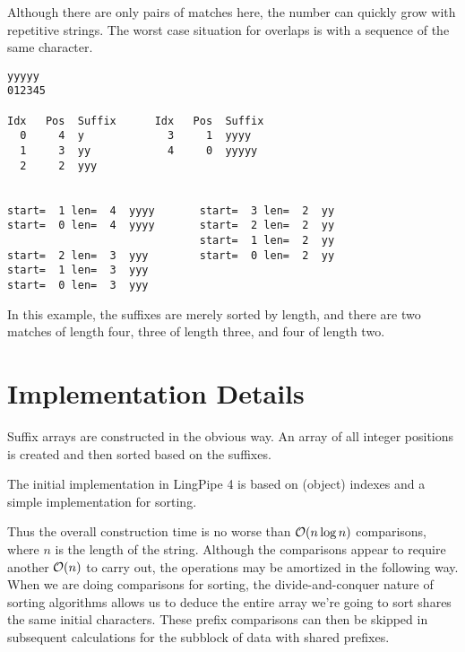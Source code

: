 Although there are only pairs of matches here, the number can
quickly grow with repetitive strings.  The worst case situation for
overlaps is with a sequence of the same character. 
%
\begin{verbatim}
yyyyy
012345

Idx   Pos  Suffix      Idx   Pos  Suffix
  0     4  y             3     1  yyyy
  1     3  yy            4     0  yyyyy
  2     2  yyy


start=  1 len=  4  yyyy       start=  3 len=  2  yy
start=  0 len=  4  yyyy       start=  2 len=  2  yy
                              start=  1 len=  2  yy
start=  2 len=  3  yyy        start=  0 len=  2  yy
start=  1 len=  3  yyy
start=  0 len=  3  yyy
\end{verbatim}
%
In this example, the suffixes are merely sorted by length, and
there are two matches of length four, three of length three, and
four of length two.









\section{Implementation Details} 

Suffix arrays are constructed in the obvious way.  An array of all
integer positions is created and then sorted based on the suffixes.

The initial implementation in LingPipe 4 is based on 
(object) indexes and a simple  implementation for
sorting.


Thus the overall construction time is no worse than ${\mathcal O}(n \log n)$
comparisons, where $n$ is the length of the string.  Although the
comparisons appear to require another ${\mathcal O}(n)$ to carry out, the
operations may be amortized in the following way.  When we are doing
comparisons for sorting, the divide-and-conquer nature of sorting
algorithms allows us to deduce the entire array we're going to sort
shares the same initial characters.  These prefix comparisons can then
be skipped in subsequent calculations for the subblock of data with
shared prefixes.











